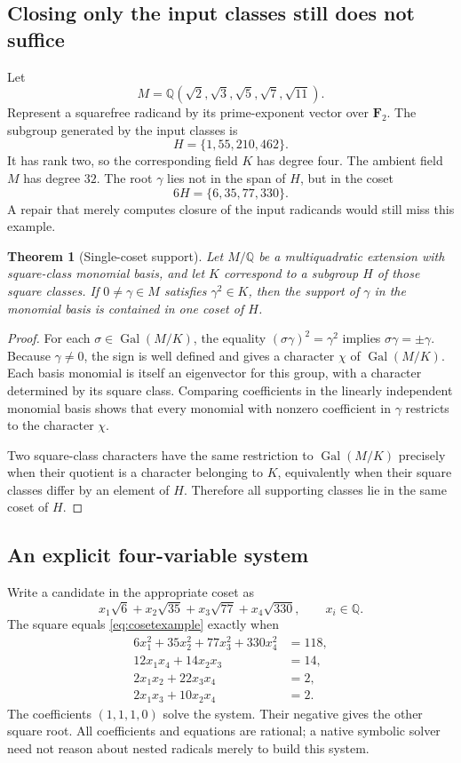 \documentclass[11pt,letterpaper]{article}
\numberwithin{equation}{section}
\newtheorem{theorem}{Theorem}[section]
\theoremstyle{definition}\newtheorem{definition}[theorem]{Definition}
\theoremstyle{remark}\newtheorem{remark}[theorem]{Remark}
\newcommand{\Q}{\mathbb Q}\newcommand{\C}{\mathbb C}\newcommand{\R}{\mathbb R}\newcommand{\Z}{\mathbb Z}
\newcommand{\Gal}{\operatorname{Gal}}
\begin{document}
\subsection{Closing only the input classes still does not suffice}
Let
\[
M=\Q(\sqrt2,\sqrt3,\sqrt5,\sqrt7,\sqrt{11}).
\]
Represent a squarefree radicand by its prime-exponent vector over $\mathbf F_2$. The subgroup generated by the input classes is
\begin{equation}
H=\{1,55,210,462\}.
\end{equation}
It has rank two, so the corresponding field $K$ has degree four. The ambient field $M$ has degree $32$. The root $\gamma$ lies not in the span of $H$, but in the coset
\begin{equation}
6H=\{6,35,77,330\}.
\end{equation}
A repair that merely computes closure of the input radicands would still miss this example.

\begin{theorem}[Single-coset support]
\label{thm:coset}
Let $M/\Q$ be a multiquadratic extension with square-class monomial basis, and let $K$ correspond to a subgroup $H$ of those square classes. If $0\ne\gamma\in M$ satisfies $\gamma^2\in K$, then the support of $\gamma$ in the monomial basis is contained in one coset of $H$.
\end{theorem}
\begin{proof}
For each $\sigma\in\Gal(M/K)$, the equality
$(\sigma\gamma)^2=\gamma^2$ implies $\sigma\gamma=\pm\gamma$. Because $\gamma\ne0$, the sign is well defined and gives a character $\chi$ of $\Gal(M/K)$. Each basis monomial is itself an eigenvector for this group, with a character determined by its square class. Comparing coefficients in the linearly independent monomial basis shows that every monomial with nonzero coefficient in $\gamma$ restricts to the character $\chi$.

Two square-class characters have the same restriction to $\Gal(M/K)$ precisely when their quotient is a character belonging to $K$, equivalently when their square classes differ by an element of $H$. Therefore all supporting classes lie in the same coset of $H$.
\end{proof}

\subsection{An explicit four-variable system}
Write a candidate in the appropriate coset as
\[
x_1\sqrt6+x_2\sqrt{35}+x_3\sqrt{77}+x_4\sqrt{330},\qquad x_i\in\Q.
\]
The square equals \eqref{eq:cosetexample} exactly when
\begin{align}
6x_1^2+35x_2^2+77x_3^2+330x_4^2&=118,\\
12x_1x_4+14x_2x_3&=14,\\
2x_1x_2+22x_3x_4&=2,\\
2x_1x_3+10x_2x_4&=2.
\end{align}
The coefficients $(1,1,1,0)$ solve the system. Their negative gives the other square root. All coefficients and equations are rational; a native symbolic solver need not reason about nested radicals merely to build this system.
\end{document}
